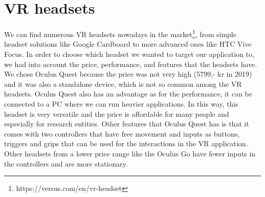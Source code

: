 \section{VR headsets}
We can find numerous VR headsets nowadays in the market\footnote{https://versus.com/en/vr-headset}, from simple headset solutions like Google Cardboard to more advanced ones like HTC Vive Focus. In order to choose which headset we wanted to target our application to, we had into account the price, performance, and features that the headsets have. We chose Oculus Quest because the price was not very high (5799,- kr in 2019) and it was also a standalone device, which is not so common among the VR headsets. Oculus Quest also has an advantage as for the performance, it can be connected to a PC where we can run heavier applications. In this way, this headset is very versatile and the price is affordable for many people and especially for research entities. Other features that Oculus Quest has is that it comes with two controllers that have free movement and inputs as buttons, triggers and grips that can be used for the interactions in the VR application. Other headsets from a lower price range like the Oculus Go have fewer inputs in the controllers and are more stationary.

